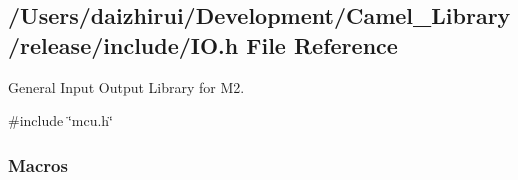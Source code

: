 \hypertarget{a00014}{}\subsection{/\+Users/daizhirui/\+Development/\+Camel\+\_\+\+Library/release/include/\+IO.h File Reference}
\label{a00014}


General Input Output Library for M2.  


{\ttfamily \#include \char`\"{}mcu.\+h\char`\"{}}\newline
\subsubsection*{Macros}
